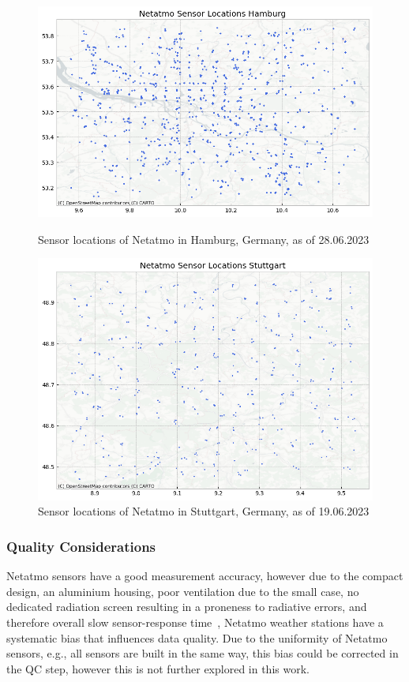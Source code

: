 \begin{figure}[htp]
    \centering
    \includegraphics[width=1\textwidth]{images/netatmo_sensor_locations_hamburg.png}
    \caption{Sensor locations of Netatmo in Hamburg, Germany, as of 28.06.2023}
    \label{fig:netatmo sensor locations hamburg}

    \includegraphics[width=1\textwidth]{images/netatmo_sensor_locations_stuttgart.png}
    \caption{Sensor locations of Netatmo in Stuttgart, Germany, as of 19.06.2023}
    \label{fig:netatmo sensor locations stuttgart}
\end{figure}

\subsubsection{Quality Considerations}

Netatmo sensors have a good measurement accuracy, however due to the compact design, an aluminium housing, poor ventilation due to the small case, no dedicated radiation screen resulting in a proneness to radiative errors, and therefore overall slow sensor-response time~\cite{meier2017crowdsourcing, buchau2018modelling}, Netatmo weather stations have a systematic bias that influences data quality. Due to the uniformity of Netatmo sensors, e.g., all sensors are built in the same way, this bias could be corrected in the QC step, however this is not further explored in this work.

